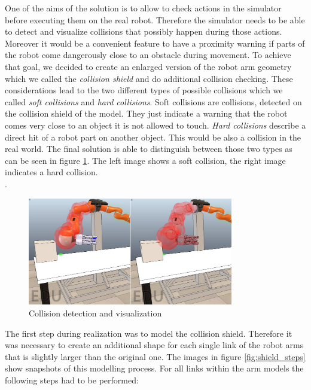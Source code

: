 One of the aims of the solution is to allow to check actions in the simulator before executing them on the real robot. Therefore the simulator needs to be able to detect and visualize collisions that possibly happen during those actions. Moreover it would be a convenient feature to have a proximity warning if parts of the robot come dangerously close to an obstacle during movement. To achieve that goal, we decided to create an enlarged version of the robot arm geometry which we called the \emph{collision shield} and do additional collision checking. These considerations lead to the two different types of possible collisions which we called \emph{soft collisions} and \emph{hard collisions}. Soft collisions are collisions, detected on the collision shield of the model. They just indicate a warning that the robot comes very close to an object it is not allowed to touch. \emph{Hard collisions} describe a direct hit of a robot part on another object. This would be also a collision in the real world. The final solution is able to distinguish between those two types as can be seen in figure \ref{fig:collision}. The left image shows a soft collision, the right image indicates a hard collision.\\. 

\begin{figure}
	\centering
  	\includegraphics[width=0.8\textwidth]{images/collision.jpg}
	\caption{Collision detection and visualization}
	\label{fig:collision}
\end{figure}

The first step during realization was to model the collision shield. Therefore it was necessary to create an additional shape for each single link of the robot arms that is slightly larger than the original one. The images in figure \ref{fig:shield_steps} show snapshots of this modelling process. For all links within the arm models the following steps had to be performed:

